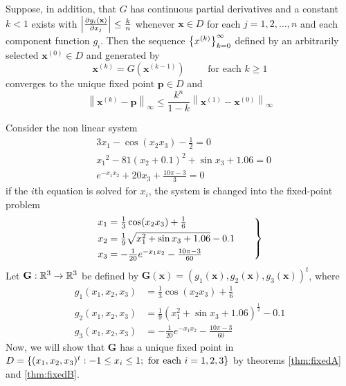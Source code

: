 \documentclass[../main-sheet.tex]{subfiles}
\begin{document}
Suppose, in addition, that \(G\) has continuous partial derivatives and a constant \(k<1\) exists with \(\left\vert\frac{\partial g_i(\mathbf{x})}{\partial x_j}\right\vert\leq \frac{k}{n}\) whenever \(\mathbf{x}\in D\) for each \(j=1,2,\dots,n\) and each component function \(g_i\). Then the sequence \(\left\{x^{(k)}\right\}^\infty_{k=0}\) defined by an arbitrarily selected \(\mathbf{x}^{(0)}\in D\) and generated by
\[
    \mathbf{x}^{(k)}=G\left( \mathbf{x}^{(k-1)} \right)\qquad \text{ for each }k\geq 1
\]
converges to the unique fixed point \(\mathbf{p}\in D\) and 
\begin{equation}
    \left\|\mathbf{x}^{(k)}-\mathbf{p}\right\|_\infty\leq\frac{k^n}{1-k}\left\|\mathbf{x}^{(1)}-\mathbf{x}^{(0)}\right\|_\infty
    \label{eq:fixed2}
\end{equation}
\begin{ex}
    Consider the non linear system
    \begin{align*}
        &3x_1-\cos(x_2x_3)-\frac{1}{2}=0\\
        &{x_1}^2-81(x_2+0.1)^2+\sin x_3+1.06=0\\
        &e^{-x_1x_2}+20x_3+\frac{10\pi -3}{3}=0
    \end{align*}
    if the \(i\)th equation is solved for \(x_i\), the system is changed into the fixed-point problem
    \begin{equation}
        \begin{rcases}
            x_1=\frac{1}{3}\cos(x_2x_3)+\frac{1}{6}\\
            x_2=\frac{1}{9}\sqrt{x_1^2+\sin x_3+1.06}-0.1\qquad\\
            x_3=-\frac{1}{20}e^{-x_1x_2}-\frac{10\pi -3}{60}
        \end{rcases}
        \label{eq:fixed4}
    \end{equation}
    Let \(\mathbf{G}:\mathbb{R}^3\to\mathbb{R}^3\) be defined by \(\mathbf{G}(\mathbf{x})=\left( g_1(\mathbf{x}),g_2(\mathbf{x}),g_3(\mathbf{x}) \right)^t\), where 
    \begin{align*}
        g_1(x_1,x_2,x_3)&=\frac{1}{3}\cos(x_2x_3)+\frac{1}{6}\\
        g_2(x_1,x_2,x_3)&=\frac{1}{9}\left(x_1^2+\sin x_3+1.06\right)^{\frac{1}{2}}-0.1\\
        g_3(x_1,x_2,x_3)&=-\frac{1}{20}e^{-x_1x_2}-\frac{10\pi -3}{60}
    \end{align*}
    Now, we will show that \(\mathbf{G}\) has a unique fixed point in \(D=\left\{(x_1,x_2,x_3)^t:-1\leq x_i\leq1;\text{ for each } i=1,2,3\right\}\) by theorems \ref{thm:fixedA} and \ref{thm:fixedB}.\\

\end{ex}
\end{document}
